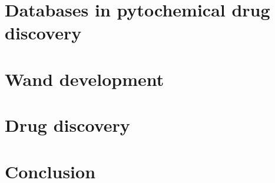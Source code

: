 \documentclass[11pt,a4paper]{report}
\begin{document}
\chapter{Databases in pytochemical drug discovery}
\chapter{Wand development}
\chapter{Drug discovery}
\chapter{Conclusion}
\end{document}
